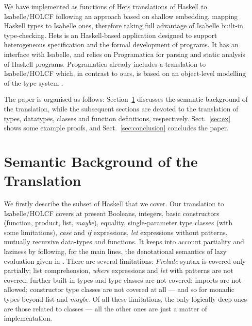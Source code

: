 \documentclass{llncs}
\begin{document}
We have implemented as functions of Hets translations of Haskell to
Isabelle/HOLCF following an approach based on shallow embedding,
mapping Haskell types to Isabelle ones, therefore taking full
advantage of Isabelle built-in type-checking. Hets
\cite{MossaTh,HetsUG,Hets} is an Haskell-based application designed to
support heterogeneous specification and the formal development of
programs. It has an interface with Isabelle, and relies on
Programatica \cite{Prog04} for parsing and static analysis of Haskell
programs.  Programatica already includes a translation to
Isabelle/HOLCF which, in contrast to ours, is based on an object-level
modelling of the type system \cite{Huff}.

The paper is organised as follows: Section~\ref{sec:semantics} discusses
the semantic background of the translation, while the subsequent sections
are devoted to the translation of types, datatypes, classes and function
definitions, respectively. Sect.~\ref{sec:ex} shows some example proofs,
and Sect.~\ref{sec:conclusion} concludes the paper.


\section{Semantic Background of the Translation}
\label{sec:semantics}

We firstly describe the subset of Haskell that we cover.
Our translation to Isabelle/HOLCF covers at present Booleans, integers, basic
constructors (function, product, list, \emph{maybe}), equality,
single-parameter type classes (with some limitations), \emph{case} and
\emph{if} expressions, \emph{let} expressions without patterns, mutually
recursive data-types and functions. 
It keeps into account partiality and laziness by
following, for the main lines, the denotational semantics of lazy evaluation
given in \cite{winskel}. There are several limitations: \emph{Prelude} syntax
is covered only partially; list comprehension, \emph{where} expressions and
\emph{let} with patterns are not covered; further built-in types and type
classes are not covered; imports are not allowed; constructor type classes are
not covered at all --- and so for monadic types beyond list and \emph{maybe}.
Of all these limitations, the only logically deep ones are those related to
classes --- all the other ones are just a matter of implementation.
\end{document}
